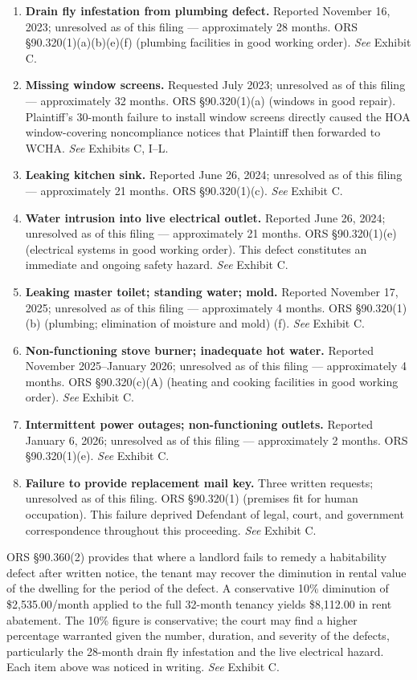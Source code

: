 \documentclass[12pt,letterpaper]{article}
\begin{document}
\begin{enumerate}[label=(\alph*)]
  \item \textbf{Drain fly infestation from plumbing defect.} Reported November 16, 2023; unresolved as of this filing --- approximately 28 months. ORS \S90.320(1)(a)(b)(e)(f) (plumbing facilities in good working order). \textit{See} Exhibit C.
  \item \textbf{Missing window screens.} Requested July 2023; unresolved as of this filing --- approximately 32 months. ORS \S90.320(1)(a) (windows in good repair). Plaintiff's 30-month failure to install window screens directly caused the HOA window-covering noncompliance notices that Plaintiff then forwarded to WCHA. \textit{See} Exhibits C, I--L.
  \item \textbf{Leaking kitchen sink.} Reported June 26, 2024; unresolved as of this filing --- approximately 21 months. ORS \S90.320(1)(c). \textit{See} Exhibit C.
  \item \textbf{Water intrusion into live electrical outlet.} Reported June 26, 2024; unresolved as of this filing --- approximately 21 months. ORS \S90.320(1)(e) (electrical systems in good working order). This defect constitutes an immediate and ongoing safety hazard. \textit{See} Exhibit C.
  \item \textbf{Leaking master toilet; standing water; mold.} Reported November 17, 2025; unresolved as of this filing --- approximately 4 months. ORS \S90.320(1)(b) (plumbing; elimination of moisture and mold) (f). \textit{See} Exhibit C.
  \item \textbf{Non-functioning stove burner; inadequate hot water.} Reported November 2025--January 2026; unresolved as of this filing --- approximately 4 months. ORS \S90.320(c)(A) (heating and cooking facilities in good working order). \textit{See} Exhibit C.
  \item \textbf{Intermittent power outages; non-functioning outlets.} Reported January 6, 2026; unresolved as of this filing --- approximately 2 months. ORS \S90.320(1)(e). \textit{See} Exhibit C.
  \item \textbf{Failure to provide replacement mail key.} Three written requests; unresolved as of this filing. ORS \S90.320(1) (premises fit for human occupation). This failure deprived Defendant of legal, court, and government correspondence throughout this proceeding. \textit{See} Exhibit C.
\end{enumerate}

ORS \S90.360(2) provides that where a landlord fails to remedy a habitability defect after written notice, the tenant may recover the diminution in rental value of the dwelling for the period of the defect. A conservative 10\% diminution of \$2,535.00/month applied to the full 32-month tenancy yields \$8,112.00 in rent abatement. The 10\% figure is conservative; the court may find a higher percentage warranted given the number, duration, and severity of the defects, particularly the 28-month drain fly infestation and the live electrical hazard. Each item above was noticed in writing. \textit{See} Exhibit C.
\end{document}
